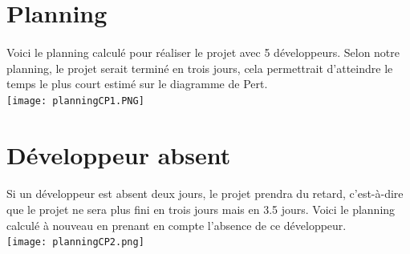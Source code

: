 \documentclass[french]{article}
\begin{document}
\section{Planning}

    \paragraph{} Voici le planning calculé pour réaliser le projet avec 5 développeurs. Selon notre planning, le projet serait terminé en trois jours, cela permettrait d'atteindre le temps le plus court estimé sur le diagramme de Pert.\\
    
\texttt{[image: planningCP1.PNG]}

\section{Développeur absent}
    \paragraph{}Si un développeur est absent deux jours, le projet prendra du retard, c'est-à-dire que le projet ne sera plus fini en trois jours mais en 3.5 jours. Voici le planning calculé à nouveau en prenant en compte l'absence de ce développeur.\\
    
\texttt{[image: planningCP2.png]}
\end{document}
